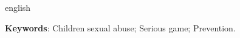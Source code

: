 \begin{resumo}[Abstract]
\begin{otherlanguage*}{english}
   
  \textbf{Keywords}: Children sexual abuse; Serious game; Prevention. 
 \end{otherlanguage*}
\end{resumo}
